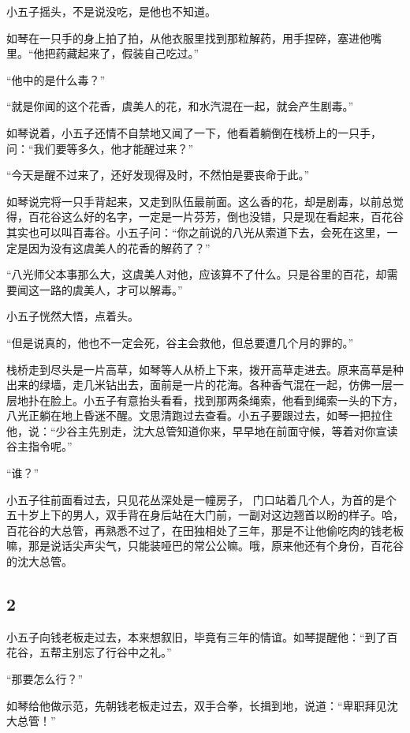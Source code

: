 小五子摇头，不是说没吃，是他也不知道。

如琴在一只手的身上拍了拍，从他衣服里找到那粒解药，用手捏碎，塞进他嘴里。“他把药藏起来了，假装自己吃过。”

“他中的是什么毒？”

“就是你闻的这个花香，虞美人的花，和水汽混在一起，就会产生剧毒。”

如琴说着，小五子还情不自禁地又闻了一下，他看着躺倒在栈桥上的一只手，问：“我们要等多久，他才能醒过来？”

“今天是醒不过来了，还好发现得及时，不然怕是要丧命于此。”

如琴说完将一只手背起来，又走到队伍最前面。这么香的花，却是剧毒，以前总觉得，百花谷这么好的名字，一定是一片芬芳，倒也没错，只是现在看起来，百花谷其实也可以叫百毒谷。小五子问：“你之前说的八光从索道下去，会死在这里，一定是因为没有这虞美人的花香的解药了？”

“八光师父本事那么大，这虞美人对他，应该算不了什么。只是谷里的百花，却需要闻这一路的虞美人，才可以解毒。”

小五子恍然大悟，点着头。

“但是说真的，他也不一定会死，谷主会救他，但总要遭几个月的罪的。”

栈桥走到尽头是一片高草，如琴等人从桥上下来，拨开高草走进去。原来高草是种出来的绿墙，走几米钻出去，面前是一片的花海。各种香气混在一起，仿佛一层一层地扑在脸上。小五子有意抬头看看，找到那两条绳索，他看到绳索一头的下方，八光正躺在地上昏迷不醒。文思清跑过去查看。小五子要跟过去，如琴一把拉住他，说：“少谷主先别走，沈大总管知道你来，早早地在前面守候，等着对你宣读谷主指令呢。”

“谁？”

小五子往前面看过去，只见花丛深处是一幢房子，
门口站着几个人，为首的是个五十岁上下的男人，双手背在身后站在大门前，一副对这边翘首以盼的样子。哈，百花谷的大总管，再熟悉不过了，在田独相处了三年，那是不让他偷吃肉的钱老板嘛，那是说话尖声尖气，只能装哑巴的常公公嘛。哦，原来他还有个身份，百花谷的沈大总管。
\newline

{\centering\subsection{2}}

小五子向钱老板走过去，本来想叙旧，毕竟有三年的情谊。如琴提醒他：“到了百花谷，五帮主别忘了行谷中之礼。”

“那要怎么行？”

如琴给他做示范，先朝钱老板走过去，双手合拳，长揖到地，说道：“卑职拜见沈大总管！”

